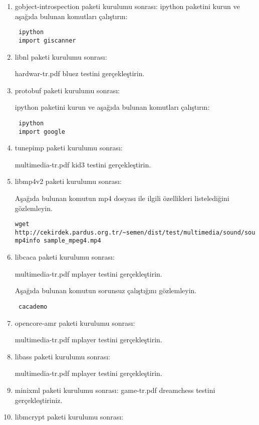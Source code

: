 \documentclass[a4paper,10pt]{article}
\begin{document}
\begin{enumerate}
\item gobject-introspection paketi kurulumu sonrası:
ipython paketini kurun ve aşağıda bulunan komutları çalıştırın:
\begin{verbatim}
 ipython
 import giscanner
\end{verbatim}


\item libnl paketi kurulumu sonrası:

hardwar-tr.pdf bluez testini gerçekleştirin.
\item protobuf paketi kurulumu sonrası:

ipython paketini kurun ve aşağıda bulunan komutları çalıştırın:
\begin{verbatim}
 ipython
 import google
\end{verbatim}
\item tunepimp paketi kurulumu sonrası:

multimedia-tr.pdf kid3 testini gerçekleştirin.

\item libmp4v2 paketi kurulumu sonrası:

Aşağıda bulunan komutun mp4 dosyası ile ilgili özellikleri listelediğini gözlemleyin.
\begin{verbatim}
wget http://cekirdek.pardus.org.tr/~semen/dist/test/multimedia/sound/sound/sample_mpeg4.mp4
mp4info sample_mpeg4.mp4 
\end{verbatim}

\item libcaca paketi kurulumu sonrası:

multimedia-tr.pdf mplayer testini gerçekleştirin.

Aşağıda bulunan komutun sorunsuz çalıştığını gözlemleyin.
\begin{verbatim}
 cacademo
\end{verbatim}

\item opencore-amr paketi kurulumu sonrası:

multimedia-tr.pdf mplayer testini gerçekleştirin.

\item libass paketi kurulumu sonrası:

multimedia-tr.pdf mplayer testini gerçekleştirin.

\item minixml paketi kurulumu sonrası:
game-tr.pdf dreamchess testini gerçekleştiriniz.

\item libmcrypt paketi kurulumu sonrası:


\end{enumerate}
\end{document}
